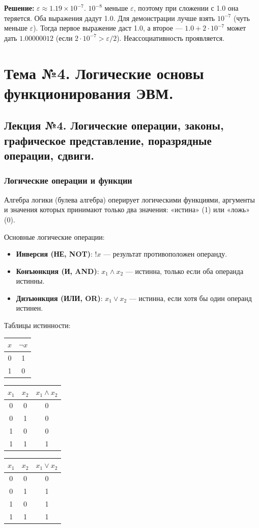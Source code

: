 \documentclass[a4paper,14pt]{report}
\begin{document}
\textbf{Решение:}
$\varepsilon \approx 1.19\times10^{-7}$. $10^{-8}$ меньше $\varepsilon$, поэтому при сложении с 1.0 она теряется. Оба выражения дадут 1.0. Для демонстрации лучше взять $10^{-7}$ (чуть меньше $\varepsilon$). Тогда первое выражение даст 1.0, а второе — $1.0 + 2\cdot10^{-7}$ может дать $1.00000012$ (если $2\cdot10^{-7} > \varepsilon/2$). Неассоциативность проявляется.


\chapter{Тема №4. Логические основы функционирования ЭВМ.}
\section{Лекция №4. Логические операции, законы, графическое представление, поразрядные операции, сдвиги.}

\subsection{Логические операции и функции}
Алгебра логики (булева алгебра) оперирует логическими функциями, аргументы и значения которых принимают только два значения: «истина» (1) или «ложь» (0).

Основные логические операции:
\begin{itemize}
    \item \textbf{Инверсия (НЕ, NOT)}: $!x$ — результат противоположен операнду.
    \item \textbf{Конъюнкция (И, AND)}: $x_1 \land x_2$ — истинна, только если оба операнда истинны.
    \item \textbf{Дизъюнкция (ИЛИ, OR)}: $x_1 \lor x_2$ — истинна, если хотя бы один операнд истинен.
\end{itemize}

Таблицы истинности:

\begin{center}
\begin{tabular}{c|c}
$x$ & $\neg x$ \\
\hline
0 & 1 \\
1 & 0
\end{tabular}
\qquad
\begin{tabular}{cc|c}
$x_1$ & $x_2$ & $x_1 \land x_2$ \\
\hline
0 & 0 & 0 \\
0 & 1 & 0 \\
1 & 0 & 0 \\
1 & 1 & 1
\end{tabular}
\qquad
\begin{tabular}{cc|c}
$x_1$ & $x_2$ & $x_1 \lor x_2$ \\
\hline
0 & 0 & 0 \\
0 & 1 & 1 \\
1 & 0 & 1 \\
1 & 1 & 1
\end{tabular}
\end{center}
\end{document}
